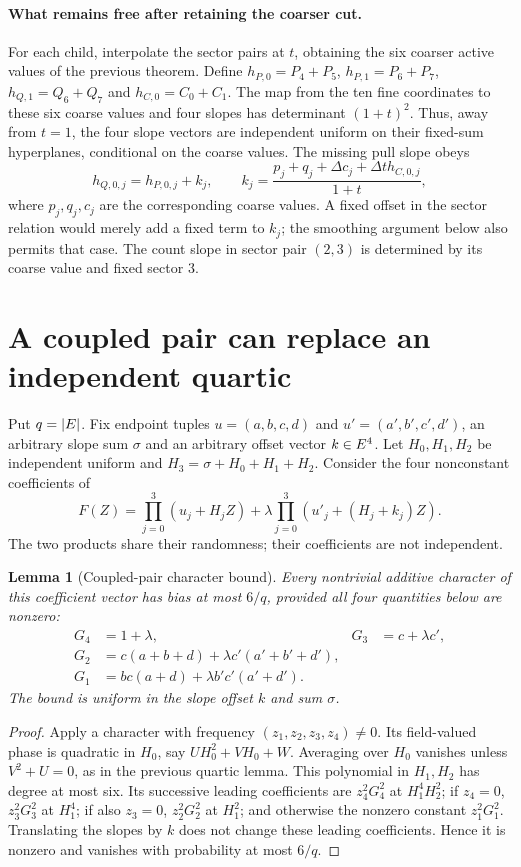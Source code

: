 \documentclass[11pt]{article}
\newtheorem{lemma}{Lemma}
\begin{document}
\paragraph{What remains free after retaining the coarser cut.} For each child, interpolate the sector pairs at $t$, obtaining the six coarser active values of the previous theorem. Define $h_{P,0}=P_4+P_5$, $h_{P,1}=P_6+P_7$, $h_{Q,1}=Q_6+Q_7$ and $h_{C,0}=C_0+C_1$. The map from the ten fine coordinates to these six coarse values and four slopes has determinant $(1+t)^2$. Thus, away from $t=1$, the four slope vectors are independent uniform on their fixed-sum hyperplanes, conditional on the coarse values. The missing pull slope obeys
\[
 h_{Q,0,j}=h_{P,0,j}+k_j,\qquad
 k_j=\frac{p_j+q_j+\Delta c_j+\Delta t h_{C,0,j}}{1+t},
\]
where $p_j,q_j,c_j$ are the corresponding coarse values. A fixed offset in the sector relation would merely add a fixed term to $k_j$; the smoothing argument below also permits that case. The count slope in sector pair $(2,3)$ is determined by its coarse value and fixed sector $3$.

\section{A coupled pair can replace an independent quartic}

Put $q=|E|$. Fix endpoint tuples $u=(a,b,c,d)$ and $u'=(a',b',c',d')$, an arbitrary slope sum $\sigma$ and an arbitrary offset vector $k\in E^4$. Let $H_0,H_1,H_2$ be independent uniform and $H_3=\sigma+H_0+H_1+H_2$. Consider the four nonconstant coefficients of
\[
 F(Z)=\prod_{j=0}^3(u_j+H_jZ)
       +\lambda\prod_{j=0}^3(u'_j+(H_j+k_j)Z).
\]
The two products share their randomness; their coefficients are not independent.

\begin{lemma}[Coupled-pair character bound]
Every nontrivial additive character of this coefficient vector has bias at most $6/q$, provided all four quantities below are nonzero:
\[
\begin{aligned}
 G_4&=1+\lambda, &G_3&=c+\lambda c',\\
 G_2&=c(a+b+d)+\lambda c'(a'+b'+d'),\\
 G_1&=bc(a+d)+\lambda b'c'(a'+d').
\end{aligned}
\]
The bound is uniform in the slope offset $k$ and sum $\sigma$.
\end{lemma}
\begin{proof}
Apply a character with frequency $(z_1,z_2,z_3,z_4)\ne0$. Its field-valued phase is quadratic in $H_0$, say $UH_0^2+VH_0+W$. Averaging over $H_0$ vanishes unless $V^2+U=0$, as in the previous quartic lemma. This polynomial in $H_1,H_2$ has degree at most six. Its successive leading coefficients are $z_4^2G_4^2$ at $H_1^4H_2^2$; if $z_4=0$, $z_3^2G_3^2$ at $H_1^4$; if also $z_3=0$, $z_2^2G_2^2$ at $H_1^2$; and otherwise the nonzero constant $z_1^2G_1^2$. Translating the slopes by $k$ does not change these leading coefficients. Hence it is nonzero and vanishes with probability at most $6/q$.
\end{proof}
\end{document}
